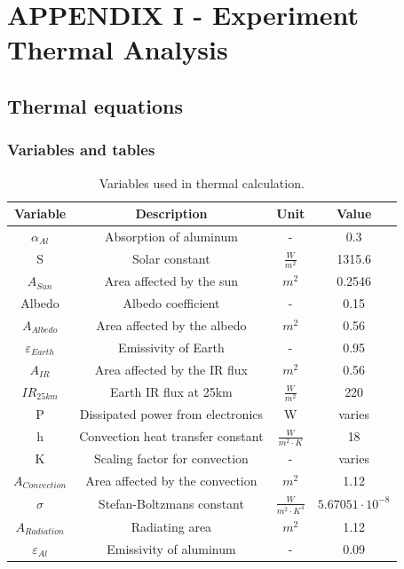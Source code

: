 \newpage
\section{APPENDIX I - Experiment Thermal Analysis} \label{sec:appI}
\subsection{Thermal equations}

\subsubsection{Variables and tables}
\begin{table}[H]
    \centering
    \caption{Variables used in thermal calculation.}
    \begin{tabular}{|c|c|c|c|}
        \hline
        Variable & Description & Unit & Value \\ \hline
        $\alpha_{Al}$ & Absorption of aluminum & - & 0.3 \\ \hline
        S & Solar constant & $\frac{W}{m^2}$ & 1315.6 \\ \hline
        $A_{Sun}$ & Area affected by the sun & $m^2$ & 0.2546 \\ \hline
        Albedo & Albedo coefficient & - & 0.15 \\ \hline
        $A_{Albedo}$ & Area affected by the albedo & $m^2$ & 0.56 \\ \hline
        $\varepsilon_{Earth}$ & Emissivity of Earth & - & 0.95 \\ \hline
        $A_{IR}$ & Area affected by the IR flux & $m^2$ & 0.56 \\ \hline
        $IR_{25km}$ & Earth IR flux at 25km & $\frac{W}{m^2}$ & 220 \\ \hline
        P & Dissipated power from electronics & W & varies \\ \hline
        h & Convection heat transfer constant & $\frac{W}{m^2 \cdot K}$ & 18 \\ \hline
        K & Scaling factor for convection & - & varies \\ \hline
        $A_{Convection}$ & Area affected by the convection & $m^2$ & 1.12 \\ \hline
        $\sigma$ & Stefan-Boltzmans constant & $\frac{W}{m^2 \cdot K^4}$ & $5.67051 \cdot 10^{-8}$ \\ \hline
        $A_{Radiation}$ & Radiating area & $m^2$ & 1.12\\ \hline
        $\varepsilon_{Al}$ & Emissivity of aluminum & - & 0.09 \\ \hline

\end{tabular}
\end{table}
